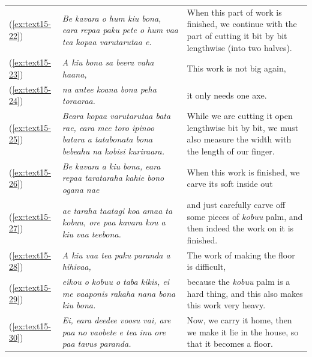 \documentclass[output=paper]{langscibook}
\begin{document}
\begin{xltabular}{\textwidth}{lXX}
    (\ref{ex:text15-22})&\textit{Be kavara o hum kiu bona, eara repaa paku pete o hum vaa tea kopaa varutarutaa e.}&When this part of work is finished, we continue with the part of cutting it bit by bit lengthwise (into two halves).\\
    (\ref{ex:text15-23})&\textit{A kiu bona sa beera vaha haana,}&This work is not big again,\\
    (\ref{ex:text15-24})&\textit{na antee koana bona peha toraaraa.}&it only needs one axe.\\
    (\ref{ex:text15-25})&\textit{Beara kopaa varutarutaa bata rae, eara mee toro ipinoo batara a tatabonata bona bebeahu na kobisi kuriraara.}&While we are cutting it open lengthwise bit by bit, we must also measure the width with the length of our finger.\\
    (\ref{ex:text15-26})&\textit{Be kavara a kiu bona, eara repaa tarataraha kahie bono ogana nae}&When this work is finished, we carve its soft inside out\\
    (\ref{ex:text15-27})&\textit{ae taraha taatagi koa amaa ta kobuu, ore paa kavara kou a kiu vaa teebona.}&and just carefully carve off some pieces of \textit{kobuu} palm, and then indeed the work on it is finished.\\
    (\ref{ex:text15-28})&\textit{A kiu vaa tea paku paranda a hihivaa,}&The work of making the floor is difficult,\\
    (\ref{ex:text15-29})&\textit{eikou o kobuu o taba kikis, ei me vaaponis rakaha nana bona kiu bona.}&because the \textit{kobuu} palm is a hard thing, and this also makes this work very heavy.\\
    (\ref{ex:text15-30})&\textit{Ei, eara deedee voosu vai, are paa no vaobete e tea inu ore paa tavus paranda.}&Now, we carry it home, then we make it lie in the house, so that it becomes a floor.\footnotemark\\
\end{xltabular}
\end{document}
